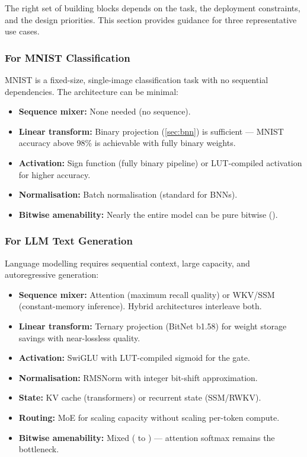 The right set of building blocks depends on the task, the deployment
constraints, and the design priorities. This section provides guidance
for three representative use cases.

\subsubsection{For MNIST Classification}

MNIST is a fixed-size, single-image classification task with no
sequential dependencies. The architecture can be minimal:

\begin{itemize}[leftmargin=2em]
  \item \textbf{Sequence mixer:} None needed (no sequence).
  \item \textbf{Linear transform:} Binary projection
    (\cref{sec:bnn}) is sufficient --- MNIST accuracy above 98\% is
    achievable with fully binary weights.
  \item \textbf{Activation:} Sign function (fully binary pipeline) or
    LUT-compiled activation for higher accuracy.
  \item \textbf{Normalisation:} Batch normalisation (standard for BNNs).
  \item \textbf{Bitwise amenability:} Nearly the entire model can be
    pure bitwise ().
\end{itemize}

\subsubsection{For LLM Text Generation}

Language modelling requires sequential context, large capacity, and
autoregressive generation:

\begin{itemize}[leftmargin=2em]
  \item \textbf{Sequence mixer:} Attention (maximum recall quality) or
    WKV/SSM (constant-memory inference). Hybrid architectures
    interleave both.
  \item \textbf{Linear transform:} Ternary projection (BitNet b1.58)
    for weight storage savings with near-lossless quality.
  \item \textbf{Activation:} SwiGLU with LUT-compiled sigmoid for the
    gate.
  \item \textbf{Normalisation:} RMSNorm with integer bit-shift
    approximation.
  \item \textbf{State:} KV cache (transformers) or recurrent state
    (SSM/RWKV).
  \item \textbf{Routing:} MoE for scaling capacity without scaling
    per-token compute.
  \item \textbf{Bitwise amenability:} Mixed ( to
    ) --- attention softmax remains the bottleneck.
\end{itemize}

